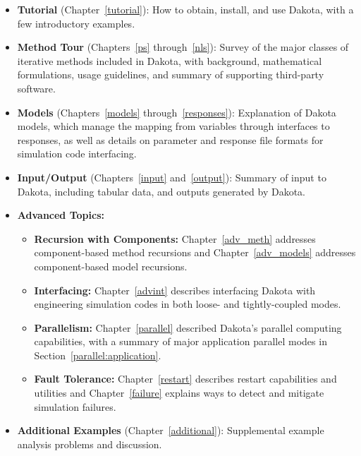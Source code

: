 \begin{itemize}

\item {\bf Tutorial} (Chapter~\ref{tutorial}): How to obtain, install,
  and use Dakota, with a few introductory examples.

\item {\bf Method Tour} (Chapters~\ref{ps} through~\ref{nls}): Survey
  of the major classes of iterative methods included in Dakota, with
  background, mathematical formulations, usage guidelines, and summary
  of supporting third-party software.

\item {\bf Models} (Chapters~\ref{models} through~\ref{responses}):
  Explanation of Dakota models, which manage the mapping from
  variables through interfaces to responses, as well as details on
  parameter and response file formats for simulation code interfacing.

\item {\bf Input/Output} (Chapters~\ref{input} and~\ref{output}):
  Summary of input to Dakota, including tabular data, and outputs
  generated by Dakota.

\item {\bf Advanced Topics:}
  \begin{itemize}

  \item {\bf Recursion with Components:} Chapter~\ref{adv_meth}
    addresses component-based method recursions and
    Chapter~\ref{adv_models} addresses component-based model recursions.

  \item {\bf Interfacing:} Chapter~\ref{advint} describes interfacing
    Dakota with engineering simulation codes in both loose- and
    tightly-coupled modes.

  \item {\bf Parallelism:} Chapter~\ref{parallel} described Dakota's
    parallel computing capabilities, with a summary of major
    application parallel modes in Section~\ref{parallel:application}.

  \item {\bf Fault Tolerance:} Chapter~\ref{restart} describes restart
    capabilities and utilities and Chapter~\ref{failure} explains ways
    to detect and mitigate simulation failures.

  \end{itemize}

\item {\bf Additional Examples} (Chapter~\ref{additional}):
  Supplemental example analysis problems and discussion.

\end{itemize}

